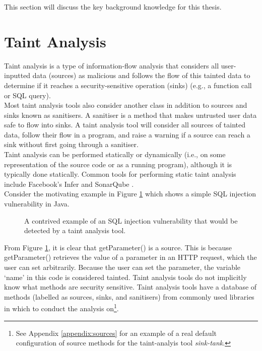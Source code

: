 This section will discuss the key background knowledge for this thesis. 

\section{Taint Analysis}

Taint analysis is a type of information-flow analysis that considers all user-inputted data (sources) as malicious and follows the flow of this tainted data to determine if it reaches a security-sensitive operation (sinks) \cite{effective-taint-analysis} (e.g., a function call or SQL query). \\ 

\noindent
Most taint analysis tools also consider another class in addition to sources and sinks known as sanitisers. A sanitiser is a method that makes untrusted user data safe to flow into sinks. A taint analysis tool will consider all sources of tainted data, follow their flow in a program, and raise a warning if a source can reach a sink without first going through a sanitiser. \\

\noindent
Taint analysis can be performed statically or dynamically (i.e., on some representation of the source code or as a running program), although it is typically done statically. Common tools for performing static taint analysis include Facebook's Infer \cite{infer} and SonarQube \cite{sonarqube}. \\

\noindent
Consider the motivating example in Figure \ref{figure-taint-example} which shows a simple SQL injection vulnerability in Java.\\

\begin{figure}[H]
    
    \caption{A contrived example of an SQL injection vulnerability that would be detected by a taint analysis tool.}
    \label{figure-taint-example}
\end{figure}

\noindent
From Figure \ref{figure-taint-example}, it is clear that getParameter() is a source. This is because getParameter() retrieves the value of a parameter in an HTTP request, which the user can set arbitrarily. Because the user can set the parameter, the variable `name' in this code is considered tainted. Taint analysis tools do not implicitly know what methods are security sensitive. Taint analysis tools have a database of methods (labelled as sources, sinks, and sanitisers) from commonly used libraries in which to conduct the analysis on\footnote{See Appendix \ref{appendix:sources} for an example of a real default configuration of source methods for the taint-analyis tool \emph{sink-tank}.}.\\

